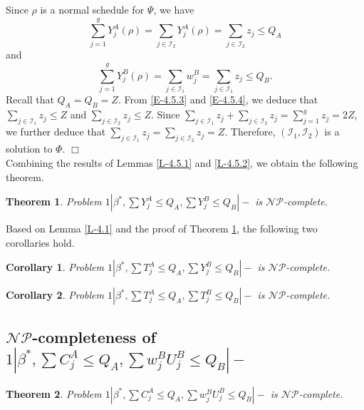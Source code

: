 \documentclass[12pt]{article}
\newtheorem{theorem}{Theorem}[section]
\newtheorem{cor}{Corollary}[section]
\begin{document}
\begin{sloppypar}
Since $\rho$ is a normal schedule for $\Psi$, we have
\begin{equation} \label{E-4.5.3}
\sum_{j=1}^g Y_j^A(\rho)=\sum_{j \in \mathcal{I}_2} Y_j^A(\rho)=\sum_{j \in \mathcal{I}_2} z_j\leq Q_A
\end{equation}
and
\begin{equation}\label{E-4.5.4}
\sum_{j=1}^g Y_j^B(\rho)=\sum_{j \in \mathcal{I}_1} w_j^B =\sum_{j \in \mathcal{I}_1} z_j \leq Q_B.
\end{equation}
Recall that $Q_A=Q_B=Z$. From \eqref{E-4.5.3} and \eqref{E-4.5.4}, we deduce that
$\sum_{j \in \mathcal{I}_1} z_j \leq Z$ and $\sum_{j \in \mathcal{I}_2} z_j \leq Z$.
Since $\sum_{j \in \mathcal{I}_1}z_j +\sum_{j \in \mathcal{I}_2} z_j = \sum_{j=1}^g z_j =2Z$, we further deduce that $\sum_{j \in \mathcal{I}_1} z_j= \sum_{j \in \mathcal{I}_2} z_j=Z$.
Therefore, $(\mathcal{I}_1, \mathcal{I}_2)$ is a solution to $\Phi$. \hfill$\Box$\\

Combining the results of Lemmas \ref{L-4.5.1} and \ref{L-4.5.2}, we obtain the following theorem.
\begin{theorem} \label{T-4.5}
Problem $1 | \beta^{*}, \sum Y_j^A \leq Q_A, \sum Y_j^B \leq Q_B|-$ is $\mathcal{NP}$-complete.
\end{theorem}

Based on Lemma \ref{L-4.1} and the proof of Theorem \ref{T-4.5}, the following two corollaries hold.

\begin{cor} \label{C-4.5.1}
Problem $1 | \beta^{*}, \sum T_j^A \leq Q_A, \sum Y_j^B \leq Q_B|-$ is $\mathcal{NP}$-complete.
\end{cor}

\begin{cor} \label{C-4.5.2}
Problem $1 | \beta^{*}, \sum T_j^A \leq Q_A, \sum T_j^B \leq Q_B|-$ is $\mathcal{NP}$-complete.
\end{cor}

\subsection{$\mathcal{NP}$-completeness of $1 | \beta^{*}, \sum C_j^A \leq Q_A, \sum w_j^B U_j^B \leq Q_B|-$}

\begin{theorem} \label{T-4.2}
Problem $1 | \beta^{*}, \sum C_j^A \leq Q_A, \sum w_j^B U_j^B \leq Q_B|-$ is $\mathcal{NP}$-complete.
\end{theorem}


\end{sloppypar}
\end{document}
